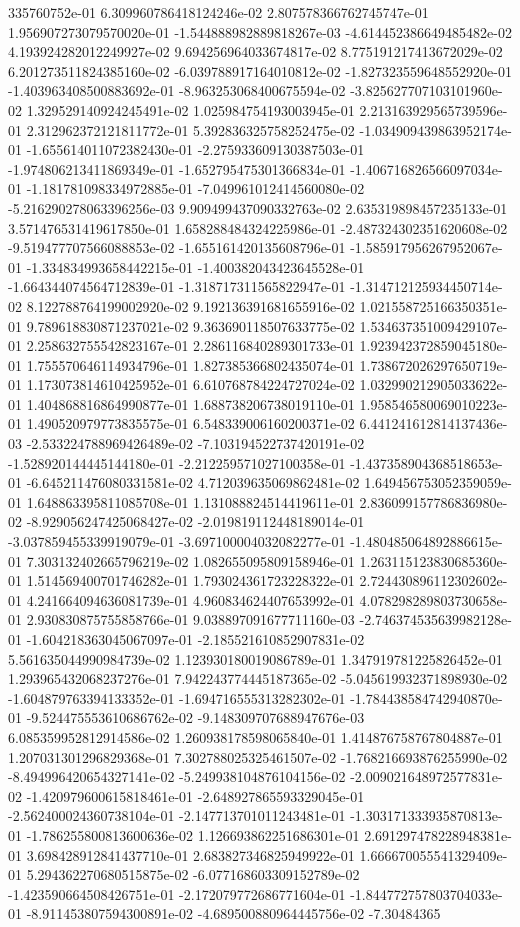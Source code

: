 335760752e-01	6.309960786418124246e-02	2.807578366762745747e-01	1.956907273079570020e-01	-1.544888982889818267e-03	-4.614452386649485482e-02	4.193924282012249927e-02	9.694256964033674817e-02	8.775191217413672029e-02	6.201273511824385160e-02	-6.039788917164010812e-02	-1.827323559648552920e-01	-1.403963408500883692e-01	-8.963253068400675594e-02	-3.825627707103101960e-02	1.329529140924245491e-02	1.025984754193003945e-01	2.213163929565739596e-01	2.312962372121811772e-01	5.392836325758252475e-02	-1.034909439863952174e-01	-1.655614011072382430e-01	-2.275933609130387503e-01	-1.974806213411869349e-01	-1.652795475301366834e-01	-1.406716826566097034e-01	-1.181781098334972885e-01	-7.049961012414560080e-02	-5.216290278063396256e-03	9.909499437090332763e-02	2.635319898457235133e-01	3.571476531419617850e-01	1.658288484324225986e-01	-2.487324302351620608e-02	-9.519477707566088853e-02	-1.655161420135608796e-01	-1.585917956267952067e-01	-1.334834993658442215e-01	-1.400382043423645528e-01	-1.664344074564712839e-01	-1.318717311565822947e-01	-1.314712125934450714e-02	8.122788764199002920e-02	9.192136391681655916e-02	1.021558725166350351e-01	9.789618830871237021e-02	9.363690118507633775e-02	1.534637351009429107e-01	2.258632755542823167e-01	2.286116840289301733e-01	1.923942372859045180e-01	1.755570646114934796e-01	1.827385366802435074e-01	1.738672026297650719e-01	1.173073814610425952e-01	6.610768784224727024e-02	1.032990212905033622e-01	1.404868816864990877e-01	1.688738206738019110e-01	1.958546580069010223e-01	1.490520979773835575e-01	6.548339006160200371e-02	6.441241612814137436e-03	-2.533224788969426489e-02	-7.103194522737420191e-02	-1.528920144445144180e-01	-2.212259571027100358e-01	-1.437358904368518653e-01	-6.645211476080331581e-02	4.712039635069862481e-02	1.649456753052359059e-01	1.648863395811085708e-01	1.131088824514419611e-01	2.836099157786836980e-02	-8.929056247425068427e-02	-2.019819112448189014e-01	-3.037859455339919079e-01	-3.697100004032082277e-01	-1.480485064892886615e-01	7.303132402665796219e-02	1.082655095809158946e-01	1.263115123830685360e-01	1.514569400701746282e-01	1.793024361723228322e-01	2.724430896112302602e-01	4.241664094636081739e-01	4.960834624407653992e-01	4.078298289803730658e-01	2.930830875755858766e-01	9.038897091677711160e-03	-2.746374535639982128e-01	-1.604218363045067097e-01	-2.185521610852907831e-02	5.561635044990984739e-02	1.123930180019086789e-01	1.347919781225826452e-01	1.293965432068237276e-01	7.942243774445187365e-02	-5.045619932371898930e-02	-1.604879763394133352e-01	-1.694716555313282302e-01	-1.784438584742940870e-01	-9.524475553610686762e-02	-9.148309707688947676e-03	6.085359952812914586e-02	1.260938178598065840e-01	1.414876758767804887e-01	1.207031301296829368e-01	7.302788025325461507e-02	-1.768216693876255990e-02	-8.494996420654327141e-02	-5.249938104876104156e-02	-2.009021648972577831e-02	-1.420979600615818461e-01	-2.648927865593329045e-01	-2.562400024360738104e-01	-2.147713701011243481e-01	-1.303171333935870813e-01	-1.786255800813600636e-02	1.126693862251686301e-01	2.691297478228948381e-01	3.698428912841437710e-01	2.683827346825949922e-01	1.666670055541329409e-01	5.294362270680515875e-02	-6.077168603309152789e-02	-1.423590664508426751e-01	-2.172079772686771604e-01	-1.844772757803704033e-01	-8.911453807594300891e-02	-4.689500880964445756e-02	-7.30484365